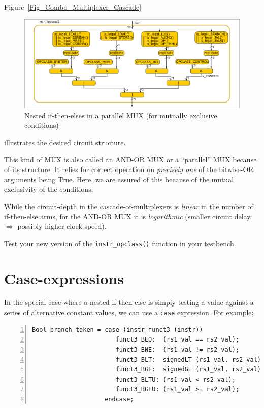   Figure~\ref{Fig_Combo_Multiplexer_Cascade}
  \begin{figure}[htbp]
    \centerline{\includegraphics[width=6in,angle=0]{Figures/Fig_Combo_Multiplexer_Parallel}}
    \caption{\label{Fig_Combo_Multiplexer_Parallel}
             Nested if-then-elses in a parallel MUX (for mutually exclusive conditions)}
  \end{figure}
  illustrates the desired circuit structure.

  This kind of MUX is also called an AND-OR MUX or a ``parallel'' MUX
  because of its structure.  It relies for correct operation on
  \emph{precisely one} of the bitwise-OR arguments being True.  Here,
  we are assured of this because of the mutual exclusivity of the
  conditions.

  While the circuit-depth in the cascade-of-multiplexers is
  \emph{linear} in the number of if-then-else arms, for the AND-OR MUX
  it is \emph{logarithmic} (smaller circuit delay
  $\Longrightarrow$ possibly higher clock speed).

\Exercise

Test your new version of the \verb|instr_opclass()| function in your
testbench.

\Endexercise


\section{Case-expressions}

\label{BSV_case_expressions}


In the special case where a nested if-then-else is simply testing a
value against a series of alternative constant values, we can use a
\verb|case| expression.  For example:

{\small
\begin{Verbatim}[frame=single, numbers=left, label=from src\_Common/Fn\_EX\_Control.bsv]
Bool branch_taken = case (instr_funct3 (instr))
                       funct3_BEQ:  (rs1_val == rs2_val);
                       funct3_BNE:  (rs1_val != rs2_val);
                       funct3_BLT:  signedLT (rs1_val, rs2_val);
                       funct3_BGE:  signedGE (rs1_val, rs2_val);
                       funct3_BLTU: (rs1_val < rs2_val);
                       funct3_BGEU: (rs1_val >= rs2_val);
                    endcase;
\end{Verbatim}
}


